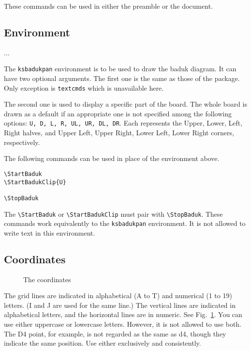 \documentclass[a4paper]{oblivoir}
\renewcommand\figurename{Fig.}
\renewcommand\fref[1]{\figurename~\ref{#1}}
\begin{document}
These commands can be used in either the preamble or the document.

\subsection{%
Environment
}

\begin{boxedverbatim}
\begin{ksbadukpan}[ball,badukpancolor=<color>,badukpansize=<size>,%
    posmark,imageback,imagefile=<file>][<pos>]
...
\end{ksbadukpan}
\end{boxedverbatim}

The \texttt{ksbadukpan} environment is to be used to draw the baduk diagram.
It can have two optional arguments. The first one is the same as those of the package. Only exception is \texttt{textcmds} which is unavailable here.

The second one is used 
to display a specific
part of the board. The whole board is drawn as a default
if an appropriate one is not specified among the following options:
\texttt{U, D, L, R, UL, UR, DL, DR}. 
Each represents the Upper, Lower, Left, Right halves, and Upper Left, Upper Right, Lower Left, Lower Right corners, respectively.

The following commands can be used in place of the environment above.
\begin{verbatim}
\StartBaduk
\StartBadukClip{U}

\StopBaduk
\end{verbatim}
The \verb|\StartBaduk| or \verb|\StartBadukClip| must pair with \verb|\StopBaduk|.
These commands work equivalently to the \texttt{ksbadukpan} environment. It is not allowed to write text in this environment.

\subsection{%
Coordinates
}

\begin{figure}[h]
\centering
\begin{ksbadukpan}[posmark,imageback,imagefile=badukpan.jpg]
\end{ksbadukpan}
\caption{The coordinates%
}\label{fig:badukpan}
\end{figure}

The grid lines are indicated in  alphabetical (A to T) and numerical (1 to 19) letters.
(I and J are used for the same line.) 
The vertical lines are indicated in alphabetical letters, and the horizontal lines are in numeric.
See \fref{fig:badukpan}.
You can use either uppercase or lowercase letters. However, it is not allowed to use both. The D4 point, for example, is not regarded as the same as d4, though they indicate the same position. Use either exclusively and consistently.
\end{document}
